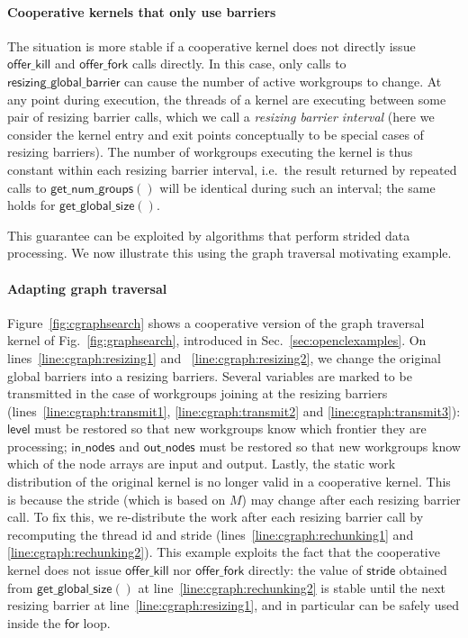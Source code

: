 \documentclass[numbers,nocopyrightspace,10pt]{sigplanconf}
\newcommand{\myfig}{Fig.~}
\newcommand{\myfiglong}{Figure~}
\newcommand{\mysec}{Sec.~}
\newcommand{\offerfork}{\mathsf{offer\_fork}}
\newcommand{\offerkill}{\mathsf{offer\_kill}}
\newcommand{\resizingglobalbarrier}{\mathsf{resizing\_global\_barrier}}
\newcommand{\getnumgroups}{\mathsf{get\_num\_groups}}
\newcommand{\getglobalsize}{\mathsf{get\_global\_size}}
\newcommand{\keyword}[1]{\mathsf{#1}}
\begin{document}
\paragraph{Cooperative kernels that only use barriers}

The situation is more stable if a cooperative kernel does not directly
issue $\offerkill$ and $\offerfork$ calls directly.  In this case,
only calls to $\resizingglobalbarrier$ can cause the number of active
workgroups to change.  At any point
during execution, the threads of a kernel are executing between some
pair of resizing barrier calls, which we call a \emph{resizing barrier
  interval} (here we consider the kernel entry and exit points
conceptually to be special cases of resizing barriers).  The number of
workgroups executing the kernel is thus constant within each resizing
barrier interval, i.e.\ the result returned by repeated calls to
$\getnumgroups()$ will be identical during such an interval; the same holds for $\getglobalsize()$.

This guarantee can be exploited by algorithms that perform strided
data processing.  We now illustrate this using the graph traversal motivating example.

\paragraph{Adapting graph traversal} 
\myfiglong\ref{fig:cgraphsearch} shows a cooperative version of the
graph traversal kernel of \myfig\ref{fig:graphsearch}, introduced in
\mysec\ref{sec:openclexamples}.  On lines~\ref{line:cgraph:resizing1}
and ~\ref{line:cgraph:resizing2}, we change the original global
barriers into a resizing barriers. Several variables are marked to be
transmitted in the case of workgroups joining at the resizing barriers
(lines~\ref{line:cgraph:transmit1}, \ref{line:cgraph:transmit2} and
\ref{line:cgraph:transmit3}): $\keyword{level}$ must be restored so
that new workgroups know which frontier they are processing;
$\keyword{in\_nodes}$ and $\keyword{out\_nodes}$ must be restored so
that new workgroups know which of the node arrays are input and
output. Lastly, the static work distribution of the original kernel is
no longer valid in a cooperative kernel. This is because the stride
(which is based on $M$) may change after each resizing barrier
call. To fix this, we re-distribute the work after each resizing
barrier call by recomputing the thread id and stride
(lines~\ref{line:cgraph:rechunking1} and
\ref{line:cgraph:rechunking2}). This example exploits the fact that
the cooperative kernel does not issue $\offerkill$ nor $\offerfork$
directly: the value of $\keyword{stride}$ obtained from
$\getglobalsize()$ at line~\ref{line:cgraph:rechunking2} is stable
until the next resizing barrier at line~\ref{line:cgraph:resizing1},
and in particular can be safely used inside the $\keyword{for}$ loop.
\end{document}
